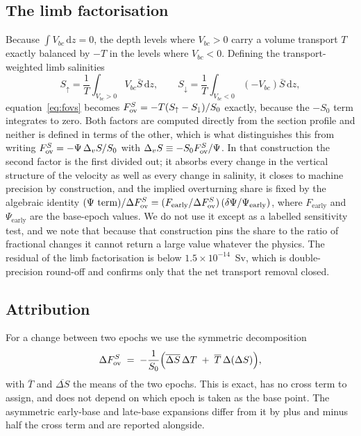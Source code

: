 \subsection*{The limb factorisation}

Because $\int V_{bc}\,\mathrm{d}z=0$, the depth levels where $V_{bc}>0$ carry a
volume transport $T$ exactly balanced by $-T$ in the levels where $V_{bc}<0$.
Defining the transport-weighted limb salinities
\begin{equation}
S_{\uparrow}=\frac{1}{T}\int_{V_{bc}>0}\! V_{bc}\bar{S}\,\mathrm{d}z,
\qquad
S_{\downarrow}=\frac{1}{T}\int_{V_{bc}<0}\! (-V_{bc})\bar{S}\,\mathrm{d}z,
\end{equation}
equation~\eqref{eq:fovs} becomes $F_{\mathrm{ov}}^{S}=-T(S_{\uparrow}-S_{\downarrow})/S_0$
exactly, because the $-S_0$ term integrates to zero. Both factors are computed
directly from the section profile and neither is defined in terms of the other,
which is what distinguishes this from writing $F_{\mathrm{ov}}^{S}=-\Psi\,\Delta_v S/S_0$
with $\Delta_v S\equiv-S_0F_{\mathrm{ov}}^{S}/\Psi$. In that construction the second factor is
the first divided out; it absorbs every change in the vertical structure of the
velocity as well as every change in salinity, it closes to machine precision by
construction, and the implied overturning share is fixed by the algebraic
identity
$(\Psi\text{ term})/\Delta F_{\mathrm{ov}}^{S}=(F_{\mathrm{early}}/\Delta F_{\mathrm{ov}}^{S})\,(\delta\Psi/\Psi_{\mathrm{early}})$,
where $F_{\mathrm{early}}$ and $\Psi_{\mathrm{early}}$ are the base-epoch
values. We do not use it except as a labelled sensitivity test, and we note that
because that construction pins the share to the ratio of fractional changes it
cannot return a large value whatever the physics. The residual of the limb
factorisation is below $1.5\times10^{-14}$~Sv, which is double-precision
round-off and confirms only that the net transport removal closed.

\subsection*{Attribution}

For a change between two epochs we use the symmetric decomposition
\begin{equation}
\Delta F_{\mathrm{ov}}^{S} \;=\; -\frac{1}{S_0}\Big(\overline{\Delta S}\,\Delta T
\;+\; \overline{T}\,\Delta(\Delta S)\Big),
\label{eq:symmetric}
\end{equation}
with $\overline{T}$ and $\overline{\Delta S}$ the means of the two epochs. This
is exact, has no cross term to assign, and does not depend on which epoch is
taken as the base point. The asymmetric early-base and late-base expansions
differ from it by plus and minus half the cross term and are reported alongside.

